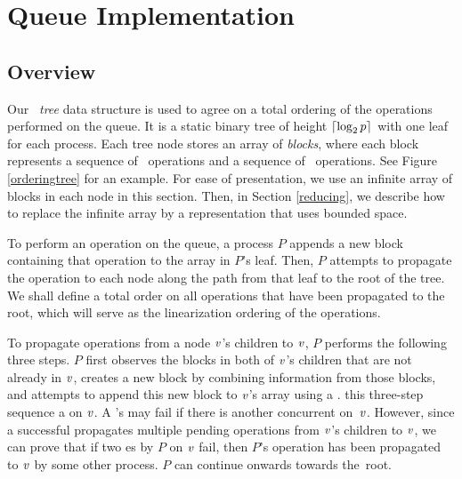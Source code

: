
\section{Queue Implementation} \label{DescriptQ}

\subsection{Overview}
Our \emph{\ordering\ tree} data structure is used to agree on a total ordering of the operations performed on the queue.
It is a static binary tree of height $\lceil \log_2 p \rceil$ with one leaf 
for each process. 
Each tree node  stores an array of \emph{blocks}, where each block represents a 
sequence of \enqueue\ operations and a sequence of \dequeue\ operations.
See Figure \ref{orderingtree} for an example.
For ease of presentation,
we use an infinite array of blocks in each node in this section.
Then, in Section \ref{reducing}, we describe how to replace the infinite array by a representation that uses bounded space.

To perform an operation on the queue, a process $P$ appends a new block containing that  
operation to the  array in $P$'s leaf.
Then, $P$ attempts to propagate the operation to each node along the path from that leaf to the root of the tree.
We shall define a total order on all operations that have been propagated to the root, which 
will serve as the linearization ordering of the operations.

To propagate operations from a node $\mbox{\textnormal{\textit{v}}}$'s children to $\mbox{\textnormal{\textit{v}}}$, $P$ performs the following
three steps.
$P$ first observes
the blocks in both of $\mbox{\textnormal{\textit{v}}}$'s children that are not already in $\mbox{\textnormal{\textit{v}}}$,
creates a new block by combining information from those blocks, and attempts to append this 
new block to $\mbox{\textnormal{\textit{v}}}$'s  array using a .
 this three-step sequence a
 on $\mbox{\textnormal{\textit{v}}}$. %
A 's  may fail if there is another concurrent  on~$\mbox{\textnormal{\textit{v}}}$.
However, since a successful  propagates multiple pending operations 
from $\mbox{\textnormal{\textit{v}}}$'s children to $\mbox{\textnormal{\textit{v}}}$,
we can prove that if two es by $P$ on $\mbox{\textnormal{\textit{v}}}$ fail,
then $P$'s operation has been propagated to $\mbox{\textnormal{\textit{v}}}$ by some other process.
 $P$ can continue 
onwards towards the~root.

